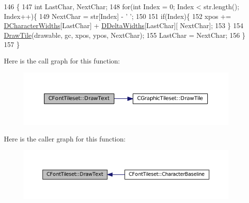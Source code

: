 \begin{DoxyCode}
146                                                                                                        \{
147     \textcolor{keywordtype}{int} LastChar, NextChar;
148     \textcolor{keywordflow}{for}(\textcolor{keywordtype}{int} Index = 0; Index < str.length(); Index++)\{
149         NextChar = str[Index] - \textcolor{charliteral}{' '};
150         
151         \textcolor{keywordflow}{if}(Index)\{
152             xpos += \hyperlink{classCFontTileset_ad25347b5350a8380be8c550d9f2e2798}{DCharacterWidths}[LastChar] + \hyperlink{classCFontTileset_a1e253853e14282e9582a7f47dace8f70}{DDeltaWidths}[LastChar][
      NextChar]; 
153         \}
154         \hyperlink{classCGraphicTileset_afefd501a74e95295b7cd2dc868dcbbcb}{DrawTile}(drawable, gc, xpos, ypos, NextChar);
155         LastChar = NextChar;
156     \}
157 \}
\end{DoxyCode}
Here is the call graph for this function\+:
\nopagebreak
\begin{figure}[H]
\begin{center}
\leavevmode
\includegraphics[width=350pt]{classCFontTileset_a4121603694e96e93378e079edd27086e_cgraph}
\end{center}
\end{figure}
Here is the caller graph for this function\+:
\nopagebreak
\begin{figure}[H]
\begin{center}
\leavevmode
\includegraphics[width=350pt]{classCFontTileset_a4121603694e96e93378e079edd27086e_icgraph}
\end{center}
\end{figure}
\hypertarget{classCFontTileset_a987f13f64865891b7bf8b10f0b519fb7}{}\label{classCFontTileset_a987f13f64865891b7bf8b10f0b519fb7} 
